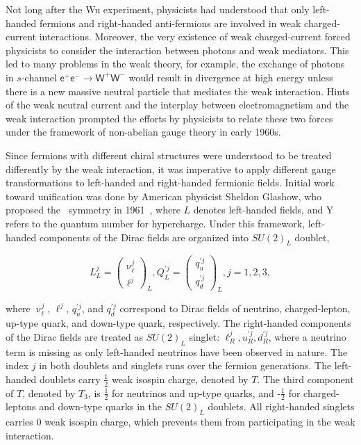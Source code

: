 Not long after the Wu experiment, physicists had understood that only left-handed fermions and right-handed anti-fermions are involved in weak charged-current interactions. Moreover, the very existence of weak charged-current forced physicists to consider the interaction between photons and weak mediators. This led to many problems in the weak theory, for example, the exchange of photons in $s$-channel $\textsf{e}^{+}\textsf{e}^{-}\rightarrow\textsf{W}^{+}\textsf{W}^{-}$ would result in divergence at high energy unless there is a new massive neutral particle that mediates the weak interaction. Hints of the weak neutral current and the interplay between electromagnetism and the weak interaction prompted the efforts by physicists to relate these two forces under the framework of non-abelian gauge theory in early 1960s. 

Since fermions with different chiral structures were understood to be treated differently by the weak interaction, it was 
imperative to apply different gauge transformations to left-handed and right-handed fermionic fields. Initial work toward unification was done by American physicist Sheldon Glashow, who proposed the \ew~symmetry in 1961~\cite{Glashow:1961tr}, where $L$ denotes left-handed fields, and Y refers to the quantum number for hypercharge. Under this framework, left-handed components of the Dirac fields are organized into $SU(2)_{L}$ doublet,

\begin{equation}
L_{L}^{j}=\begin{pmatrix}\upnu_{\ell}^{j}\\ \ell^{j}\end{pmatrix}_{L}, Q_{L}^{\prime j}=\begin{pmatrix}q^{\prime j}_{u}\\q^{\prime j}_{d}\end{pmatrix}_{L}, j=1, 2, 3,
\end{equation}

where $\upnu_{\ell}^{j}$, $\ell^{j}$, $q^{\prime j}_{u}$, and $q^{\prime j}_{d}$ correspond to Dirac fields of neutrino, charged-lepton, up-type quark, and down-type quark, respectively. The right-handed components of the Dirac fields are treated as $SU(2)_{L}$ singlet: $\ell_{R}^{j}, u_{R}^{\prime j}, d_{R}^{\prime j}$, where a neutrino term is missing as only left-handed neutrinos have been observed in nature. The index $j$ in both doublets and singlets runs over the fermion generations. The left-handed doublets carry $\frac{1}{2}$ weak isospin charge, denoted by $T$. The third component of $T$, denoted by $T_3$, is $\frac{1}{2}$ for neutrinos and up-type quarks, and -$\frac{1}{2}$ for charged-leptons and down-type quarks in the $SU(2)_{L}$ doublets. All right-handed singlets carries 0 weak isospin charge, which prevents them from participating in the weak interaction. 

